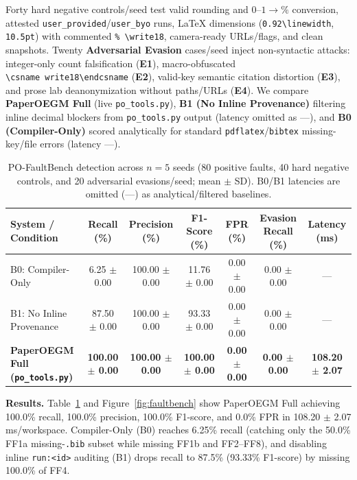 Forty hard negative controls/seed test valid rounding and \(0\text{--}1 \to \%\) conversion, attested \texttt{user\_\allowbreak{}provided}/\allowbreak{}\texttt{user\_\allowbreak{}byo} runs, LaTeX dimensions (\texttt{0.92\textbackslash{}linewidth}, \texttt{10.5pt}) with commented \texttt{\%\ \textbackslash{}write18}, camera-ready URLs/flags, and clean snapshots. Twenty \textbf{Adversarial Evasion} cases/seed inject non-syntactic attacks: integer-only count falsification (\textbf{E1}), macro-obfuscated \texttt{\textbackslash{}csname\ write18\textbackslash{}endcsname} (\textbf{E2}), valid-key semantic citation distortion (\textbf{E3}), and prose lab deanonymization without paths/URLs (\textbf{E4}). We compare \textbf{PaperOEGM Full} (live \texttt{po\_\allowbreak{}tools.\allowbreak{}py}), \textbf{B1 (No Inline Provenance)} filtering inline decimal blockers from \texttt{po\_\allowbreak{}tools.\allowbreak{}py} output (latency omitted as ---), and \textbf{B0 (Compiler-Only)} scored analytically for standard \texttt{pdflatex}/\allowbreak{}\texttt{bibtex} missing-key/file errors (latency ---).

\begin{table}[t]
\centering
\footnotesize
\setlength{\tabcolsep}{4pt}
\caption{PO-FaultBench detection across $n=5$ seeds (80 positive faults, 40 hard negative controls, and 20 adversarial evasions/seed; mean $\pm$ SD). B0/B1 latencies are omitted (---) as analytical/filtered baselines.}
\label{tab:faultbench}
\begin{tabular}{lcccccc}
\toprule
\textbf{System / Condition} & \textbf{Recall (\%)} & \textbf{Precision (\%)} & \textbf{F1-Score (\%)} & \textbf{FPR (\%)} & \textbf{Evasion Recall (\%)} & \textbf{Latency (ms)} \\
\midrule
B0: Compiler-Only & 6.25 $\pm$ 0.00 & 100.00 $\pm$ 0.00 & 11.76 $\pm$ 0.00 & 0.00 $\pm$ 0.00 & 0.00 $\pm$ 0.00 & --- \\
B1: No Inline Provenance & 87.50 $\pm$ 0.00 & 100.00 $\pm$ 0.00 & 93.33 $\pm$ 0.00 & 0.00 $\pm$ 0.00 & 0.00 $\pm$ 0.00 & --- \\
\textbf{PaperOEGM Full (\texttt{po\_\allowbreak{}tools.\allowbreak{}py})} & \textbf{100.00 $\pm$ 0.00} & \textbf{100.00 $\pm$ 0.00} & \textbf{100.00 $\pm$ 0.00} & \textbf{0.00 $\pm$ 0.00} & \textbf{0.00 $\pm$ 0.00} & \textbf{108.20 $\pm$ 2.07} \\
\bottomrule
\end{tabular}
\end{table}

\textbf{Results.} Table~\ref{tab:faultbench} and Figure~\ref{fig:faultbench} show PaperOEGM Full achieving 100.0\% recall, 100.0\% precision, 100.0\% F1-score, and 0.0\% FPR in 108.20 \(\pm\) 2.07 ms/workspace. Compiler-Only (B0) reaches 6.25\% recall (catching only the 50.0\% FF1a missing-\texttt{.bib} subset while missing FF1b and FF2--FF8), and disabling inline \texttt{run:\textless{}id\textgreater{}} auditing (B1) drops recall to 87.5\% (93.33\% F1-score) by missing 100.0\% of FF4.


